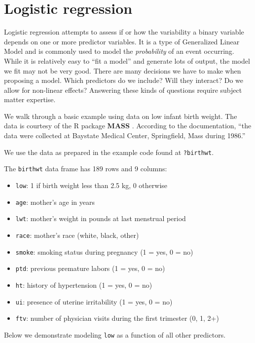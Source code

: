 \documentclass[
]{book}
\providecommand{\tightlist}{%
  \setlength{\itemsep}{0pt}\setlength{\parskip}{0pt}}
\begin{document}
\hypertarget{logistic-regression}{%
\section{Logistic regression}\label{logistic-regression}}

Logistic regression attempts to assess if or how the variability a binary variable depends on one or more predictor variables. It is a type of Generalized Linear Model and is commonly used to model the \emph{probability} of an event occurring. While it is relatively easy to ``fit a model'' and generate lots of output, the model we fit may not be very good. There are many decisions we have to make when proposing a model. Which predictors do we include? Will they interact? Do we allow for non-linear effects? Answering these kinds of questions require subject matter expertise.

We walk through a basic example using data on low infant birth weight. The data is courtesy of the R package \textbf{MASS} \citep{MASS}. According to the documentation, ``the data were collected at Baystate Medical Center, Springfield, Mass during 1986.''

We use the data as prepared in the example code found at \texttt{?birthwt}.

The \texttt{birthwt} data frame has 189 rows and 9 columns:

\begin{itemize}
\tightlist
\item
  \texttt{low}: 1 if birth weight less than 2.5 kg, 0 otherwise
\item
  \texttt{age}: mother's age in years
\item
  \texttt{lwt}: mother's weight in pounds at last menstrual period
\item
  \texttt{race}: mother's race (white, black, other)
\item
  \texttt{smoke}: smoking status during pregnancy (1 = yes, 0 = no)
\item
  \texttt{ptd}: previous premature labors (1 = yes, 0 = no)
\item
  \texttt{ht}: history of hypertension (1 = yes, 0 = no)
\item
  \texttt{ui}: presence of uterine irritability (1 = yes, 0 = no)
\item
  \texttt{ftv}: number of physician visits during the first trimester (0, 1, 2+)
\end{itemize}

Below we demonstrate modeling \texttt{low} as a function of all other predictors.
\end{document}
